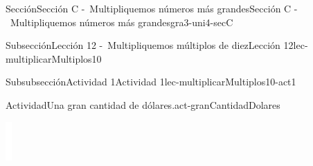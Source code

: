 \begin{sectionptx}{Sección}{Sección C -~Multipliquemos números más grandes}{}{Sección C -~Multipliquemos números más grandes}{}{}{gra3-uni4-secC}
\begin{subsectionptx}{Subsección}{Lección 12 -~Multipliquemos múltiplos de diez}{}{Lección 12}{}{}{lec-multiplicarMultiplos10}
\begin{subsubsectionptx}{Subsubsección}{Actividad 1}{}{Actividad 1}{}{}{lec-multiplicarMultiplos10-act1}
\begin{activity}{Actividad}{Una gran cantidad de dólares.}{act-granCantidadDolares}
\begin{enumerate}
\begin{enumerate}
\begin{image}{0}{1}{0}{}
\includegraphics[max width=\linewidth, center]{external/whitespace-tikz/1cm.pdf}

\end{image}
\end{enumerate}
\end{enumerate}
\end{activity}
\end{subsubsectionptx}
\end{subsectionptx}
\end{sectionptx}
